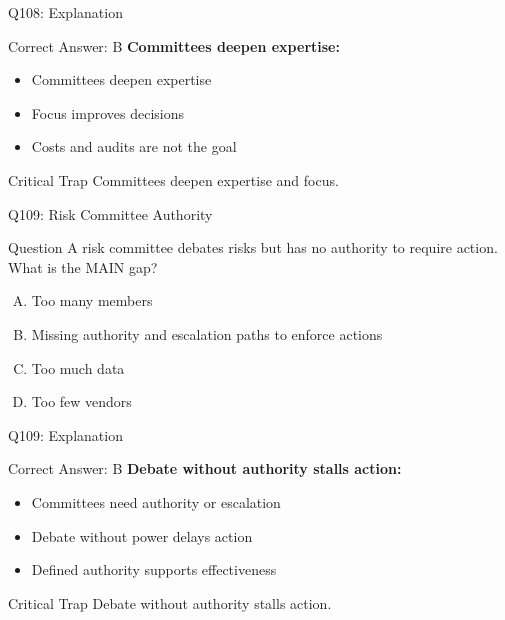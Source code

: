 \documentclass{beamer}
\begin{document}
	\begin{frame}{Q108: Explanation}
		\begin{block}{Correct Answer: B}
			\textbf{Committees deepen expertise:}
			\begin{itemize}
				\item Committees deepen expertise
				\item Focus improves decisions
				\item Costs and audits are not the goal
			\end{itemize}
		\end{block}
		\begin{alertblock}{Critical Trap}
			Committees deepen expertise and focus.
		\end{alertblock}
	\end{frame}
	
	\begin{frame}{Q109: Risk Committee Authority}
		\begin{block}{Question}
			A risk committee debates risks but has no authority to require action. What is the MAIN gap?
		\end{block}
		\begin{enumerate}[(A)]
			\item Too many members
			\item Missing authority and escalation paths to enforce actions
			\item Too much data
			\item Too few vendors
		\end{enumerate}
	\end{frame}
	
	\begin{frame}{Q109: Explanation}
		\begin{block}{Correct Answer: B}
			\textbf{Debate without authority stalls action:}
			\begin{itemize}
				\item Committees need authority or escalation
				\item Debate without power delays action
				\item Defined authority supports effectiveness
			\end{itemize}
		\end{block}
		\begin{alertblock}{Critical Trap}
			Debate without authority stalls action.
		\end{alertblock}
	\end{frame}
	
\end{document}
